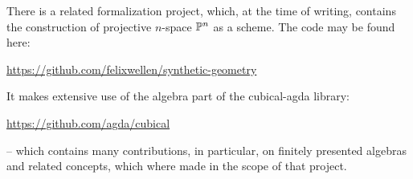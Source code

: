 There is a related formalization project, which, at the time of writing,
contains the construction of projective $n$-space $\mathbb{P}^n$ as a scheme.
The code may be found here:
\begin{center}
  \url{https://github.com/felixwellen/synthetic-geometry}
\end{center}
It makes extensive use of the algebra part of the cubical-agda library:
\begin{center}
  \url{https://github.com/agda/cubical}
\end{center}
-- which contains many contributions, in particular,
on finitely presented algebras and related concepts,
which where made in the scope of that project.